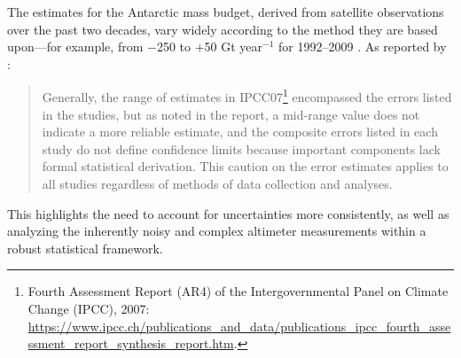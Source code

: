 The estimates for the Antarctic mass budget, derived from satellite observations over the past two decades, vary widely according to the method they are based upon---for example, from
$-$250 to $+$50 Gt year$^{-1}$ for 1992--2009 \parencite{Zwally2011}. As reported by 
\textcite{Zwally2011}:

\begin{quotation}
\noindent
Generally, the range of estimates in IPCC07\footnote{Fourth Assessment Report (AR4) of the Intergovernmental Panel on Climate Change (IPCC), 2007: \url{https://www.ipcc.ch/publications\_and\_data/publications\_ipcc\_fourth\_assessment\_report\_synthesis\_report.htm}.} encompassed the errors listed in the studies, but as noted in the report, a mid-range value does not indicate a more reliable estimate, and the composite errors listed in each study do not define confidence limits because important components lack formal statistical derivation. This caution on the error estimates applies to all studies regardless of methods of data collection and analyses.
\end{quotation}

This highlights the need to account for uncertainties more consistently, as well as analyzing the inherently noisy and complex altimeter measurements within a robust statistical framework.


